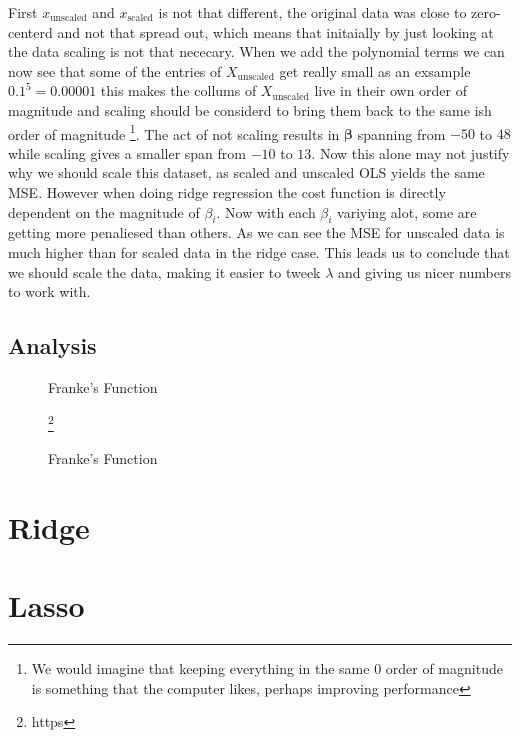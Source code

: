 \documentclass[twoside,11pt]{report}
\begin{document}
First $x_{\text{unscaled}}$ and $x_{\text{scaled}}$ is not that different, the original data was close to zero-centerd and not that spread out, which means that initaially by just looking at the data scaling is not that nececary. When we add the polynomial terms we can now see that some of the entries of $X_{\text{unscaled}}$ get really small as an exsample $0.1^5 = 0.00001$ this makes the collums of $X_{\text{unscaled}}$ live in their own order of magnitude and scaling should be considerd to bring them back to the same ish order of magnitude \footnote{We would imagine that keeping everything in the same $0$ order of magnitude is something that the computer likes, perhaps improving performance}. The act of not scaling results in $\boldsymbol{\beta}$ spanning from $-50$ to $48$ while scaling gives a smaller span from $-10$ to $13$. Now this alone may not justify why we should scale this dataset, as scaled and unscaled OLS yields the same MSE. However when doing ridge regression the cost function is directly dependent on the magnitude of $\beta_i$. Now with each $\beta_i$ variying alot, some are getting more penaliesed than others. As we can see the MSE for unscaled data is much higher than for scaled data in the ridge case.
This leads us to conclude that we should scale the data, making it easier to tweek $\lambda$ and giving us nicer numbers to work with.
\subsection{Analysis}
\begin{figure}[!h]
    \begin{center}
    \resizebox*{0.9\linewidth}{!}{}
    \caption{Franke's Function}
    \label{ols}
    \end{center}
\end{figure}
\begin{figure}[!h]
    \begin{center}
    \resizebox*{0.7\linewidth}{!}{}
    \caption{Franke's Function}
    \label{}
    \footnote{https}
    \end{center}
\end{figure}
\section{Ridge}
\section{Lasso}
\end{document}
